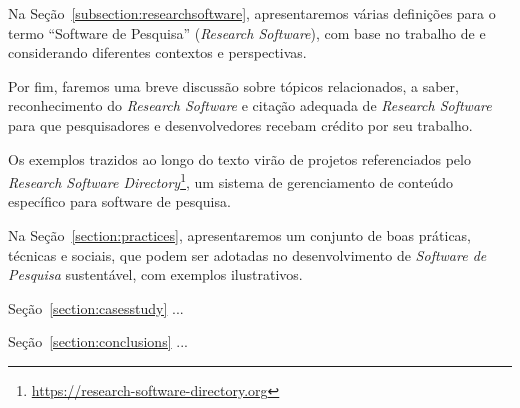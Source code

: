 Na Seção~\ref{subsection:researchsoftware}, apresentaremos várias definições para o termo ``Software de Pesquisa'' (\textit{Research Software}), com base no trabalho de \cite{sochat_research_2022} e considerando diferentes contextos e perspectivas.
%

%
Por fim, faremos uma breve discussão sobre tópicos relacionados, a saber, reconhecimento do \textit{Research Software} e citação adequada de \textit{Research Software} para que pesquisadores e desenvolvedores recebam crédito por seu trabalho.


Os exemplos trazidos ao longo do texto virão de  projetos referenciados pelo \textit{Research Software Directory}\footnote{\url{https://research-software-directory.org}},
um sistema de gerenciamento de conteúdo específico para software de pesquisa.

Na Seção~\ref{section:practices}, apresentaremos um conjunto de boas práticas, técnicas e sociais, que podem ser adotadas no desenvolvimento de \textit{Software de Pesquisa} sustentável, com exemplos ilustrativos. 


Seção~\ref{section:casesstudy} ... 

Seção~\ref{section:conclusions} ...


